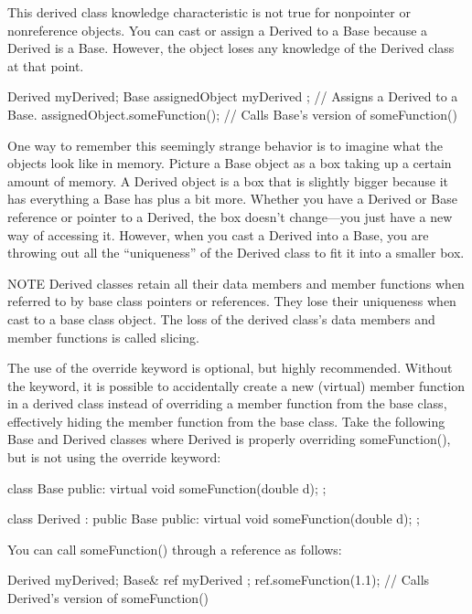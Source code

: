 This derived class knowledge characteristic is not true for nonpointer or nonreference objects. You can cast or assign a Derived to a Base because a Derived is a Base. However, the object loses any knowledge of the Derived class at that point.

\begin{cpp}
Derived myDerived;
Base assignedObject { myDerived }; // Assigns a Derived to a Base.
assignedObject.someFunction(); // Calls Base's version of someFunction()
\end{cpp}

One way to remember this seemingly strange behavior is to imagine what the objects look like in memory. Picture a Base object as a box taking up a certain amount of memory. A Derived object is a box that is slightly bigger because it has everything a Base has plus a bit more. Whether you have a Derived or Base reference or pointer to a Derived, the box doesn’t change—you just have a new way of accessing it. However, when you cast a Derived into a Base, you are throwing out all the “uniqueness” of the Derived class to fit it into a smaller box.

\begin{myNotic}{NOTE}
Derived classes retain all their data members and member functions when referred to by base class pointers or references. They lose their uniqueness when cast to a base class object. The loss of the derived class’s data members and member functions is called slicing.
\end{myNotic}


The use of the override keyword is optional, but highly recommended. Without the keyword, it is possible to accidentally create a new (virtual) member function in a derived class instead of overriding a member function from the base class, effectively hiding the member function from the base class. Take the following Base and Derived classes where Derived is properly overriding someFunction(), but is not using the override keyword:

\begin{cpp}
class Base
{
    public:
    virtual void someFunction(double d);
};

class Derived : public Base
{
    public:
    virtual void someFunction(double d);
};
\end{cpp}

You can call someFunction() through a reference as follows:

\begin{cpp}
Derived myDerived;
Base& ref { myDerived };
ref.someFunction(1.1); // Calls Derived's version of someFunction()
\end{cpp}

